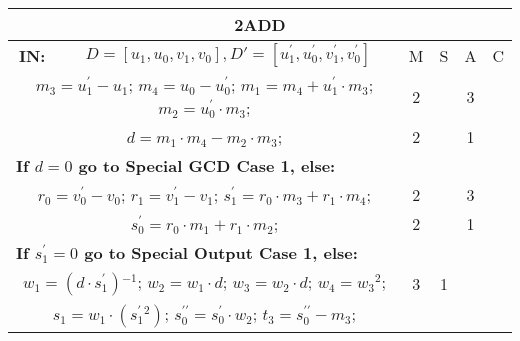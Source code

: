 \begin{tabular}{|c|cr|c|c|c|c|}
\hline
\multicolumn{7}{|c|}{\bf{2ADD}} \TS \\
\hline
\bf{IN:} &\multicolumn{2}{|c|}{$D = [u_1,u_0,v_1,v_0], D' = [u^{\prime}_1,u^{\prime}_0,v^{\prime}_1,v^{\prime}_0]$}
\TS & M & \hspace{1pt}S\hspace{1pt} & A & \hspace{1pt}C\hspace{1pt} \\
\hline
\multicolumn{3}{|R{340pt}|}{ 
$m_3=u^{\prime}_1-u_1$;\hspace{4pt}
$m_4=u_0-u^{\prime}_0$;\hspace{4pt}
$m_1=m_4+u^{\prime}_1 \cdot m_3$;\hspace{4pt}
$m_2=u^{\prime}_0 \cdot m_3$;\hspace{4pt}
} & 2 &  & 3 & \\
\multicolumn{3}{|R{340pt}|}{ 
$d=m_1 \cdot m_4-m_2 \cdot m_3$;\hspace{4pt}
} & 2 &  & 1 & \\
\multicolumn{3}{|l|}{ 
 \bf{If $d = 0$ go to Special GCD Case 1, else:} } &  &  &  & \\
\multicolumn{3}{|R{340pt}|}{ 
$r_0=v^{\prime}_0-v_0$;\hspace{4pt}
$r_1=v^{\prime}_1-v_1$;\hspace{4pt}
$s^{\prime}_1=r_0 \cdot m_3+r_1 \cdot m_4$;\hspace{4pt}
} & 2 &  & 3 & \\
\multicolumn{3}{|R{340pt}|}{ 
$s^{\prime}_0=r_0 \cdot m_1+r_1 \cdot m_2$;\hspace{4pt}
} & 2 &  & 1 & \\
\multicolumn{3}{|l|}{ 
 \bf{If $s^{\prime}_1 = 0$ go to Special Output Case 1, else:} } &  &  &  & \\
\multicolumn{3}{|R{340pt}|}{ 
$w_1=(d \cdot s^{\prime}_1){}^{-1}$;\hspace{4pt}
$w_2=w_1 \cdot d$;\hspace{4pt}
$w_3=w_2 \cdot d$;\hspace{4pt}
$w_4=w_3{}^{2}$;\hspace{4pt}
} & 3 & 1 &  & \\
\multicolumn{3}{|R{340pt}|}{ 
$s_1=w_1 \cdot (s^{\prime}_1{}^{2})$;\hspace{4pt}
$s^{\prime\prime}_0=s^{\prime}_0 \cdot w_2$;\hspace{4pt}
$t_3=s^{\prime\prime}_0-m_3$;\hspace{4pt}
}
\end{tabular}
